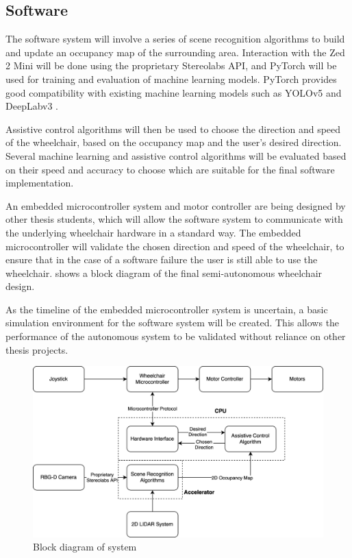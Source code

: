 \documentclass[12pt]{article}
\begin{document}
\subsection{Software}
The software system will involve a series of scene recognition algorithms to build and update an occupancy map of the surrounding area.
Interaction with the Zed 2 Mini will be done using the proprietary Stereolabs API, and
PyTorch \cite{paszkePyTorchImperativeStyle2019} will be used for training and evaluation of machine learning models.
PyTorch provides good compatibility with existing machine learning models such as YOLOv5 \cite{ultralyticsYOLOv5} and DeepLabv3 \cite{chenRethinkingAtrousConvolution2017}.

Assistive control algorithms will then be used to choose the direction and speed of the wheelchair, based on the occupancy map and the user's desired direction.
Several machine learning and assistive control algorithms will be evaluated based on their
speed and accuracy to choose which are suitable for the final software implementation.

An embedded microcontroller system and motor controller are being designed by other thesis students,
which will allow the software system to communicate with the underlying wheelchair hardware in a standard way.
The embedded microcontroller will validate the chosen direction and speed of the wheelchair, to ensure
that in the case of a software failure the user is still able to use the wheelchair. 
shows a block diagram of the final semi-autonomous wheelchair design.

As the timeline of the embedded microcontroller system is uncertain, a basic simulation environment for the software system will be created.
This allows the performance of the autonomous system to be validated without reliance on other thesis projects.
\begin{figure}[H]
    \centering
    \includegraphics[width=\linewidth]{images/block_diagram.png}
    \caption{Block diagram of system}
    \label{fig:block_diagram}
\end{figure}
\pagebreak
\end{document}
